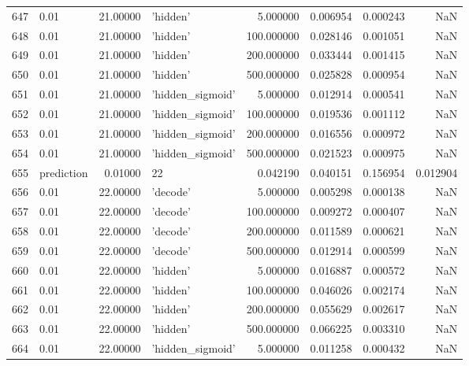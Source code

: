 \documentclass[10pt,a4paper]{article}
\begin{document}
\begin{tabular}{llrlrrrr}
647  &        0.01 &  21.00000 &           'hidden' &    5.000000 &  0.006954 &  0.000243 &       NaN \\
648  &        0.01 &  21.00000 &           'hidden' &  100.000000 &  0.028146 &  0.001051 &       NaN \\
649  &        0.01 &  21.00000 &           'hidden' &  200.000000 &  0.033444 &  0.001415 &       NaN \\
650  &        0.01 &  21.00000 &           'hidden' &  500.000000 &  0.025828 &  0.000954 &       NaN \\
651  &        0.01 &  21.00000 &   'hidden\_sigmoid' &    5.000000 &  0.012914 &  0.000541 &       NaN \\
652  &        0.01 &  21.00000 &   'hidden\_sigmoid' &  100.000000 &  0.019536 &  0.001112 &       NaN \\
653  &        0.01 &  21.00000 &   'hidden\_sigmoid' &  200.000000 &  0.016556 &  0.000972 &       NaN \\
654  &        0.01 &  21.00000 &   'hidden\_sigmoid' &  500.000000 &  0.021523 &  0.000975 &       NaN \\
655  &  prediction &   0.01000 &                 22 &    0.042190 &  0.040151 &  0.156954 &  0.012904 \\
656  &        0.01 &  22.00000 &           'decode' &    5.000000 &  0.005298 &  0.000138 &       NaN \\
657  &        0.01 &  22.00000 &           'decode' &  100.000000 &  0.009272 &  0.000407 &       NaN \\
658  &        0.01 &  22.00000 &           'decode' &  200.000000 &  0.011589 &  0.000621 &       NaN \\
659  &        0.01 &  22.00000 &           'decode' &  500.000000 &  0.012914 &  0.000599 &       NaN \\
660  &        0.01 &  22.00000 &           'hidden' &    5.000000 &  0.016887 &  0.000572 &       NaN \\
661  &        0.01 &  22.00000 &           'hidden' &  100.000000 &  0.046026 &  0.002174 &       NaN \\
662  &        0.01 &  22.00000 &           'hidden' &  200.000000 &  0.055629 &  0.002617 &       NaN \\
663  &        0.01 &  22.00000 &           'hidden' &  500.000000 &  0.066225 &  0.003310 &       NaN \\
664  &        0.01 &  22.00000 &   'hidden\_sigmoid' &    5.000000 &  0.011258 &  0.000432 &       NaN \\

\end{tabular}
\end{document}
